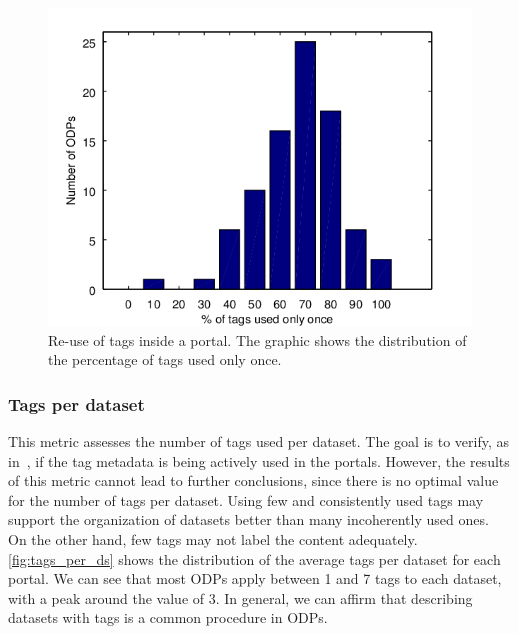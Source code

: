 \documentclass[conference]{IEEEtran}
\begin{document}
\begin{figure}[tb]
\begin{center}
\includegraphics[width=\columnwidth]{images/tag_once_dist.png}
\caption{Re-use of tags inside a portal. The graphic shows the distribution of the percentage of tags used only once.}
\label{fig:tags_once}
\end{center}
\end{figure}

\subsubsection{Tags per dataset}
This metric assesses the number of tags used per dataset.
The goal is to verify, as in~\cite{Umbrich2015}, if the tag metadata is being actively used in the portals.
However, the results of this metric cannot lead to further conclusions, since there is no optimal value for the number of tags per dataset. 
Using few and consistently used tags may support the organization of datasets better than many incoherently used ones.
On the other hand, few tags may not label the content adequately.
\autoref{fig:tags_per_ds} shows the distribution of the average tags per dataset for each portal. 
We can see that most ODPs apply between 1 and 7 tags to each dataset, with a peak around the value of 3.
In general, we can affirm that describing datasets with tags is a common procedure in ODPs.
\end{document}

